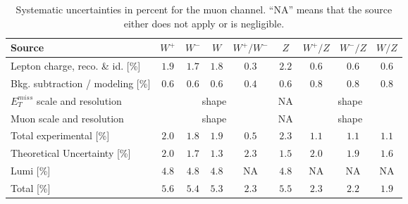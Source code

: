 \begin{table}[htbp]
\centering
\small
\begin {tabular}  {lcccccccc}
\hline
Source & $W^+$ & $W^-$ & $W$ & $W^+/W^-$ & $Z$ & $W^+/Z$ & $W^-/Z$ & $W/Z$ \\
\hline
Lepton charge, reco. \& id. [\%] & $1.9$ & $1.7$ & $1.8$ & $0.3$ & $2.2$ & $0.6$ & $0.6$ & $0.6$ \\
Bkg. subtraction / modeling [\%] & $0.6$ & $0.6$ & $0.6$ & $0.4$ & $0.6$ & $0.8$ & $0.8$ & $0.8$ \\ 
$E_{T}^{miss}$ scale and resolution  & \multicolumn{4}{c}{shape}  & NA & \multicolumn{3}{c}{shape}  \\ 
Muon scale and resolution & \multicolumn{4}{c}{shape}  & NA & \multicolumn{3}{c}{shape}  \\ 
\hline
Total experimental [\%] & $2.0$ & $1.8$ & $1.9$ & $0.5$ & $2.3$ & $1.1$ & $1.1$ & $1.1$ \\
\hline 
Theoretical Uncertainty [\%] & $2.0$ & $1.7$ & $1.3$ & $2.3$ & $1.5$ & $2.0$ & $1.9$ & $1.6$ \\
\hline
Lumi [\%] & $4.8$ & $4.8$ & $4.8$ & NA & $4.8$ & NA & NA & NA \\
\hline
Total [\%] & $5.6$ & $5.4$ & $5.3$ & $2.3$ & $5.5$ & $2.3$ & $2.2$ & $1.9$ \\
\hline
\end {tabular}
\caption[.]{ \label{tab:syst_mu}
Systematic uncertainties in percent for the muon channel. ``NA'' means that the source either does not apply or is negligible.}
\end{table} 



